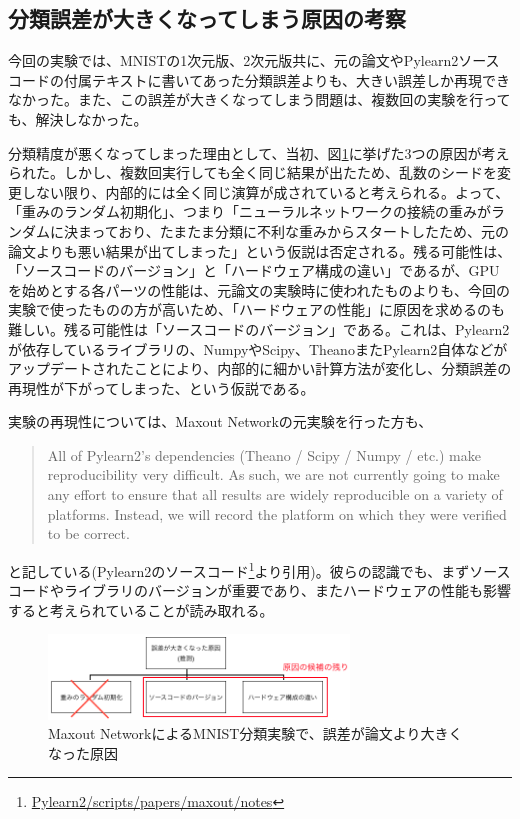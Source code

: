\subsection{分類誤差が大きくなってしまう原因の考察}
今回の実験では、MNISTの1次元版、2次元版共に、元の論文やPylearn2ソースコードの付属テキストに書いてあった分類誤差よりも、大きい誤差しか再現できなかった。また、この誤差が大きくなってしまう問題は、複数回の実験を行っても、解決しなかった。\par
分類精度が悪くなってしまった理由として、当初、図\ref{c6_maxout_cause}に挙げた3つの原因が考えられた。しかし、複数回実行しても全く同じ結果が出たため、乱数のシードを変更しない限り、内部的には全く同じ演算が成されていると考えられる。よって、「重みのランダム初期化」、つまり「ニューラルネットワークの接続の重みがランダムに決まっており、たまたま分類に不利な重みからスタートしたため、元の論文よりも悪い結果が出てしまった」という仮説は否定される。残る可能性は、「ソースコードのバージョン」と「ハードウェア構成の違い」であるが、GPUを始めとする各パーツの性能は、元論文の実験時に使われたものよりも、今回の実験で使ったものの方が高いため、「ハードウェアの性能」に原因を求めるのも難しい。残る可能性は「ソースコードのバージョン」である。これは、Pylearn2が依存しているライブラリの、NumpyやScipy、TheanoまたPylearn2自体などがアップデートされたことにより、内部的に細かい計算方法が変化し、分類誤差の再現性が下がってしまった、という仮説である。\par
実験の再現性については、Maxout Networkの元実験を行った方も、
\begin{quote}
All of Pylearn2's dependencies (Theano / Scipy / Numpy / etc.) make reproducibility
very difficult. As such, we are not currently going to make any effort to ensure that
all results are widely reproducible on a variety of platforms. Instead, we will
record the platform on which they were verified to be correct.
\end{quote}
と記している(Pylearn2のソースコード\footnote{\url{Pylearn2/scripts/papers/maxout/notes}}より引用)。彼らの認識でも、まずソースコードやライブラリのバージョンが重要であり、またハードウェアの性能も影響すると考えられていることが読み取れる。\par
\begin{figure}[tbp]
 \begin{center}
  \includegraphics[width=80mm]{img/c6/maxout_error_cause}
 \end{center}
 \caption{Maxout NetworkによるMNIST分類実験で、誤差が論文より大きくなった原因}
 \label{c6_maxout_cause}
\end{figure}
